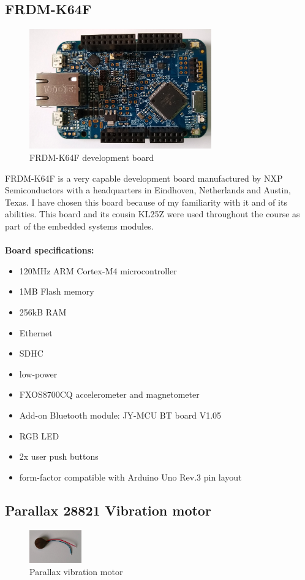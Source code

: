 \documentclass[12pt,a4paper]{article}
\begin{document}
		\subsection{FRDM-K64F}
		\begin{figure}[h]
			\centering
			\includegraphics[width=0.7\textwidth]{k64f1.jpg}\par\vspace{0cm}
			\caption{FRDM-K64F development board}
		\end{figure}
		FRDM-K64F is a very capable development board manufactured by NXP Semiconductors with a 
		headquarters in Eindhoven, Netherlands and Austin, Texas. I have chosen this board because  
		of my familiarity with it and of its abilities. This board and its cousin KL25Z were used  
		throughout the course as part of the embedded systems modules.\\  	
		\\
		{\bfseries Board specifications:}  	
		\begin{itemize}
			\item 120MHz ARM Cortex-M4 microcontroller
			\item 1MB Flash memory
			\item 256kB RAM
			\item Ethernet
			\item SDHC
			\item low-power
			\item FXOS8700CQ accelerometer and magnetometer 
			\item Add-on Bluetooth module: JY-MCU BT board V1.05
			\item RGB LED
			\item 2x user push buttons
			\item form-factor compatible with Arduino Uno Rev.3 pin layout
		\end{itemize}
		
		\subsection{Parallax 28821 Vibration motor}	
		\begin{figure}
			\centering
			\includegraphics[width=0.2\textwidth]{parallax_vib_mot1.jpg}
			\caption{Parallax vibration motor}
		\end{figure}
		
\end{document}
